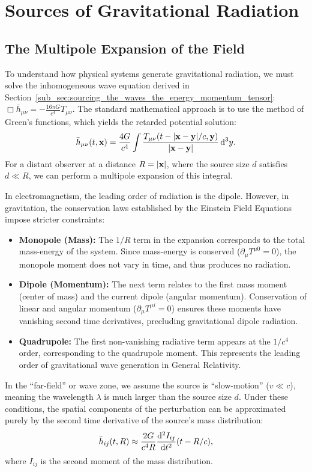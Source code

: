 \section{Sources of Gravitational Radiation}
\label{sec:sources_of_gravitational_radiation}

\subsection{The Multipole Expansion of the Field} To understand how physical systems generate gravitational radiation, we must solve the inhomogeneous wave equation derived in Section~\ref{sub_sec:sourcing_the_waves_the_energy_momentum_tensor}: $\Box \bar{h}_{\mu\nu} = -\frac{16\pi G}{c^4} T_{\mu\nu}$. The standard mathematical approach is to use the method of Green's functions, which yields the retarded potential solution:
\[%
  \bar{h}_{\mu\nu}(t, \x) = \frac{4G}{c^4} \int \frac{T_{\mu\nu}(t - |\x - \y|/c, \y)}{|\x - \y|} \dd[3]{y}
.\]%
For a distant observer at a distance $R = |\mathbf{x}|$, where the source size $d$ satisfies $d \ll R$, we can perform a multipole expansion of this integral.

In electromagnetism, the leading order of radiation is the dipole. However, in gravitation, the conservation laws established by the Einstein Field Equations impose stricter constraints:
\begin{itemize}
  \item \textbf{Monopole (Mass):} The $1/R$ term in the expansion corresponds to the total mass-energy of the system. Since mass-energy is conserved ($\partial_\mu T^{\mu 0} = 0$), the monopole moment does not vary in time, and thus produces no radiation.
  \item \textbf{Dipole (Momentum):} The next term relates to the first mass moment (center of mass) and the current dipole (angular momentum). Conservation of linear and angular momentum ($\partial_\mu T^{\mu i} = 0$) ensures these moments have vanishing second time derivatives, precluding gravitational dipole radiation.
  \item \textbf{Quadrupole:} The first non-vanishing radiative term appears at the $1/c^4$ order, corresponding to the quadrupole moment. This represents the leading order of gravitational wave generation in General Relativity.
\end{itemize}

In the ``far-field'' or wave zone, we assume the source is ``slow-motion'' ($v \ll c$), meaning the wavelength $\lambda$ is much larger than the source size $d$. Under these conditions, the spatial components of the perturbation can be approximated purely by the second time derivative of the source's mass distribution:
\[%
  \bar{h}_{ij}(t, R) \approx \frac{2G}{c^4 R} \odv[2]{I_{ij}}{t} (t - R/c)
,\]%
where $I_{ij}$ is the second moment of the mass distribution.

